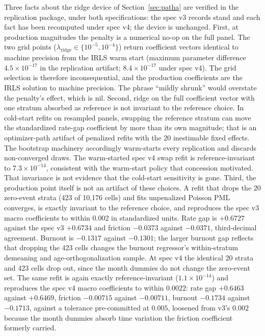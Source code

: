 \documentclass[12pt]{article}
\begin{document}
Three facts about the ridge device of Section~\ref{sec:patha} are verified in the replication package, under both specifications: the spec v3 records stand and each fact has been recomputed under spec v4; the device is unchanged. First, at production magnitudes the penalty is a numerical no-op on the full panel. The two grid points ($\lambda_{\mathrm{ridge}} \in \{10^{-5}, 10^{-4}\}$) return coefficient vectors identical to machine precision from the IRLS warm start (maximum parameter difference $4.5\times10^{-17}$ in the replication artifact; $8.4\times10^{-17}$ under spec v4). The grid selection is therefore inconsequential, and the production coefficients are the IRLS solution to machine precision. The phrase ``mildly shrunk'' would overstate the penalty's effect, which is nil. Second, ridge on the full coefficient vector with one stratum absorbed as reference is not invariant to the reference choice. In cold-start refits on resampled panels, swapping the reference stratum can move the standardized rate-gap coefficient by more than its own magnitude; that is an optimizer-path artifact of penalized refits with the 20 inestimable fixed effects. The bootstrap machinery accordingly warm-starts every replication and discards non-converged draws. The warm-started spec v4 swap refit is reference-invariant to $7.3\times10^{-14}$, consistent with the warm-start policy that concession motivated. That invariance is not evidence that the cold-start sensitivity is gone. Third, the production point itself is not an artifact of these choices. A refit that drops the 20 zero-event strata (423 of 10,176 cells) and fits unpenalized Poisson PML converges, is exactly invariant to the reference choice, and reproduces the spec v3 macro coefficients to within $0.002$ in standardized units. Rate gap is $+0.6727$ against the spec v3 $+0.6734$ and friction $-0.0373$ against $-0.0371$, third-decimal agreement. Burnout is $-0.1317$ against $-0.1301$; the larger burnout gap reflects that dropping the 423 cells changes the burnout regressor's within-stratum demeaning and age-orthogonalization sample. At spec v4 the identical 20 strata and 423 cells drop out, since the month dummies do not change the zero-event set. The same refit is again exactly reference-invariant ($1.1\times10^{-14}$) and reproduces the spec v4 macro coefficients to within $0.0022$: rate gap $+0.6463$ against $+0.6469$, friction $-0.00715$ against $-0.00711$, burnout $-0.1734$ against $-0.1713$, against a tolerance pre-committed at $0.005$, loosened from v3's $0.002$ because the month dummies absorb time variation the friction coefficient formerly carried.
\end{document}

